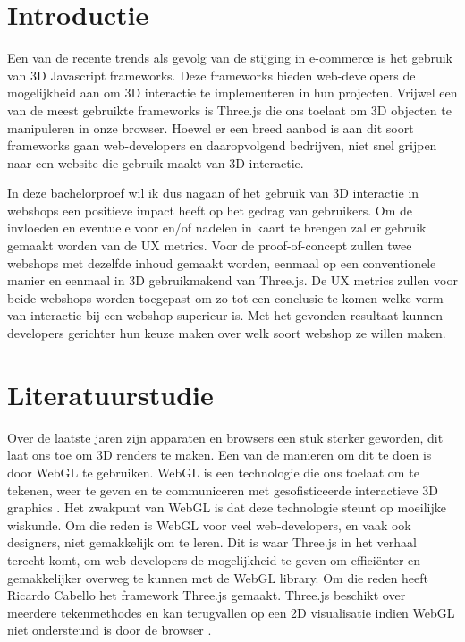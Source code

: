 
\section{Introductie}%
\label{sec:introductie}

Een van de recente trends als gevolg van de stijging in e-commerce is het gebruik van 3D Javascript frameworks. Deze frameworks bieden web-developers de mogelijkheid aan om 3D interactie te implementeren in hun projecten. Vrijwel een van de meest gebruikte frameworks is Three.js die ons toelaat om 3D objecten te manipuleren in onze browser. Hoewel er een breed aanbod is aan dit soort frameworks gaan web-developers en daaropvolgend bedrijven, niet snel grijpen naar een website die gebruik maakt van 3D interactie.

In deze bachelorproef wil ik dus nagaan of het gebruik van 3D interactie in webshops een positieve impact heeft op het gedrag van gebruikers. Om de invloeden en eventuele voor en/of nadelen in kaart te brengen zal er gebruik gemaakt worden van de UX metrics. Voor de proof-of-concept zullen twee webshops met dezelfde inhoud gemaakt worden, eenmaal op een conventionele manier en eenmaal in 3D gebruikmakend van Three.js. De UX metrics zullen voor beide webshops worden toegepast om zo tot een conclusie te komen welke vorm van interactie bij een webshop superieur is. Met het gevonden resultaat kunnen developers gerichter hun keuze maken over welk soort webshop ze willen maken.


\section{Literatuurstudie}%
\label{sec:literatuurstudie}

Over de laatste jaren zijn apparaten en browsers een stuk sterker geworden, dit laat ons toe om 3D renders te maken. Een van de manieren om dit te doen is door WebGL te gebruiken. WebGL is een technologie die ons toelaat om te tekenen, weer te geven en te communiceren met gesofisticeerde interactieve 3D graphics \autocite{Matsuda2013}. Het zwakpunt van WebGL is dat deze technologie steunt op moeilijke wiskunde. Om die reden is WebGL voor veel web-developers, en vaak ook designers, niet gemakkelijk om te leren. Dit is waar Three.js in het verhaal terecht komt, om web-developers de mogelijkheid te geven om efficiënter en gemakkelijker overweg te kunnen met de WebGL library. Om die reden heeft Ricardo Cabello het framework Three.js gemaakt. Three.js beschikt over meerdere tekenmethodes en kan terugvallen op een 2D visualisatie indien WebGL niet ondersteund is door de browser \autocite{Danchilla2012}.

